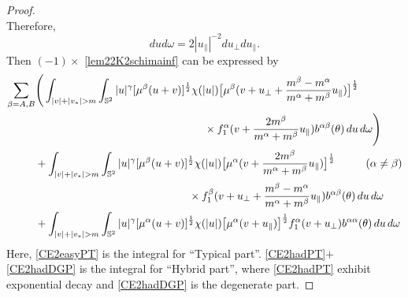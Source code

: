 \documentclass[reqno]{amsart}
\numberwithin{equation}{section}
\numberwithin{equation}{section}
\begin{document}
\begin{proof}
\begin{equation*}
		\end{equation*}
		Therefore, 
		\begin{equation}
			du d\omega = 2|u_{\parallel}|^{-2} du_{\perp} du_{\parallel}.
		\end{equation}
		Then $(-1)\times$ \eqref{lem22K2schimainf} can be expressed by
		\begin{align}
			\sum_{\beta=A,B}&\Bigg(\int_{|v|+|v_*|>m}\int_{\mathbb{S}^2} |u|^{\gamma} [\mu^{\beta}(u+v)]^{\frac{1}{2}}\chi(|u|)\big[\mu^{\beta}(v + u_{\perp}+\frac{m^{\beta}-m^{\alpha}}{m^{\alpha}+m^{\beta}}u_{\parallel})\big]^{\frac{1}{2}}\notag\\
			&\hspace{5.5cm}\times f^\alpha_1(v + \frac{2m^{\beta}}{m^{\alpha}+m^{\beta}}u_{\parallel})b^{ \alpha \beta}(\theta) \, du \, d\omega\Bigg) \label{CE2easyPT}\\
			& +\int_{|v|+|v_*|>m}\int_{\mathbb{S}^2} |u|^{\gamma} [\mu^{\beta}(u+v)]^{\frac{1}{2}}\chi(|u|)\big[\mu^{\alpha}(v + \frac{2m^{\beta}}{m^{\alpha}+m^{\beta}}u_{\parallel})\big]^{\frac{1}{2}}
			\hspace{1cm}(\alpha \neq \beta)\notag\\
			&\hspace{5cm}\times f^\beta_1(v + u_{\perp}+\frac{m^{\beta}-m^{\alpha}}{m^{\alpha}+m^{\beta}}u_{\parallel})b^{ \alpha \beta}(\theta) \, du \, d\omega \label{CE2hadPT}\\
			&+\int_{|v|+|v_*|>m}\int_{\mathbb{S}^2} |u|^{\gamma} [\mu^{\alpha}(u+v)]^{\frac{1}{2}}\chi(|u|)\big[\mu^{\alpha}(v + u_{\parallel})\big]^{\frac{1}{2}} f^\alpha_1(v + u_{\perp})b^{ \alpha \alpha}(\theta) \, du \, d\omega \label{CE2hadDGP}
		\end{align}
		Here, \eqref{CE2easyPT} is the integral for ``Typical part''. \eqref{CE2hadPT}$+$\eqref{CE2hadDGP} is the integral for ``Hybrid part'', where \eqref{CE2hadPT} exhibit exponential decay and \eqref{CE2hadDGP} is the degenerate part.
		

\end{proof}
\end{document}
